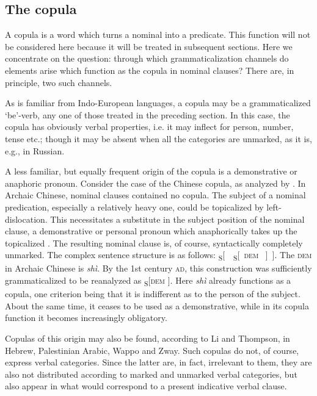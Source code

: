 \subsection{The copula} \label{sec:3.1.2}

A copula is a word which turns a nominal into a predicate. This function will not be considered here because it will be treated in subsequent sections. Here we concentrate on the question: through which grammaticalization channels do elements arise which function as the copula in nominal clauses? There are, in principle, two such channels.

As is familiar from Indo-European languages, a copula may be a grammaticalized ‘be’-verb, any one of those treated in the preceding section. In this case, the copula has obviously verbal properties, i.e. it may inflect for person, number, tense etc.; though it may be absent when all the categories are unmarked, as it is, e.g., in Russian.

A less familiar, but equally frequent origin of the copula is a demonstrative or anaphoric pronoun. Consider the case of the Chinese copula, as analyzed by \citet{LiEtAl1977}. In Archaic Chinese, nominal clauses contained no copula. The subject of a nominal predication, especially a relatively heavy one, could be topicalized by left-dislocation. This necessitates a substitute in the subject position of the nominal clause, a demonstrative or personal pronoun which anaphorically takes up the topicalized \np. The resulting nominal clause is, of course, syntactically completely unmarked. The complex sentence structure is as follows: \textsubscript{S}[~\np~\textsubscript{S}[~\textsc{dem} \np~]~]. The \textsc{dem} in Archaic Chinese is \textit{shì}. By the 1st century \textsc{ad}, this construction was sufficiently grammaticalized to be reanalyzed as \textsubscript{S}[\np \textsc{dem} \np]. Here \textit{shì} already functions as a copula, one criterion being that it is indifferent as to the person of the subject. About the same time, it ceases to be used as a demonstrative, while in its copula function it becomes increasingly obligatory.

Copulas of this origin may also be found, according to Li and Thompson, in Hebrew, Palestinian Arabic, Wappo and Zway. Such copulas do not, of course, express verbal categories. Since the latter are, in fact, irrelevant to them, they are also not distributed according to marked and unmarked verbal categories, but also appear in what would correspond to a present indicative verbal clause.

